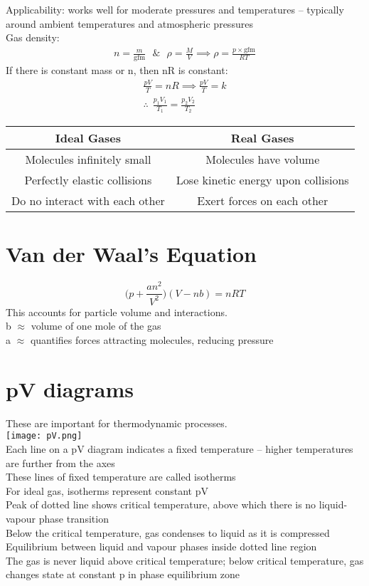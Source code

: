 \documentclass[a4paper, 11pt, fleqn, normalem]{report}
\begin{document}
Applicability: works well for moderate pressures and temperatures -- typically around ambient temperatures and atmospheric pressures \\
Gas density:
\begin{align*}
	n = \frac{m}{\text{gfm}} ~~~\&~~~ \rho = \frac{M}{V} \implies \rho = \frac{p\times\text{gfm}}{RT}
\end{align*}
If there is constant mass or n, then nR is constant:
\begin{gather*}
	\frac{pV}{T} = nR \implies \frac{pV}{T} = k \\
	\therefore ~~\frac{p_{1}V_{1}}{T_{1}} = \frac{p_{2}V_{2}}{T_{2}}
\end{gather*}

\begin{tabular}{c|c}
	Ideal Gases & Real Gases \\
	\hline
	Molecules infinitely small & Molecules have volume \\
	Perfectly elastic collisions & Lose kinetic energy upon collisions \\
	Do no interact with each other & Exert forces on each other
\end{tabular}

\section*{Van der Waal's Equation}
\vspace{-22pt}
\begin{equation*}
	\Big(p+\frac{an^{2}}{V^{2}}\Big)(V-nb) = nRT
\end{equation*}
This accounts for particle volume and interactions. \\
b $\approx$ volume of one mole of the gas \\
a $\approx$ quantifies forces attracting molecules, reducing pressure

\section*{pV diagrams}
These are important for thermodynamic processes. \\
\texttt{[image: pV.png]} \\
Each line on a pV diagram indicates a fixed temperature -- higher temperatures are further from the axes \\
These lines of fixed temperature are called isotherms \\
For ideal gas, isotherms represent constant pV \\
Peak of dotted line shows critical temperature, above which there is no liquid-vapour phase transition \\
Below the critical temperature, gas condenses to liquid as it is compressed \\
Equilibrium between liquid and vapour phases inside dotted line region \\
The gas is never liquid above critical temperature; below critical temperature, gas changes state at constant p in phase equilibrium zone
\end{document}
